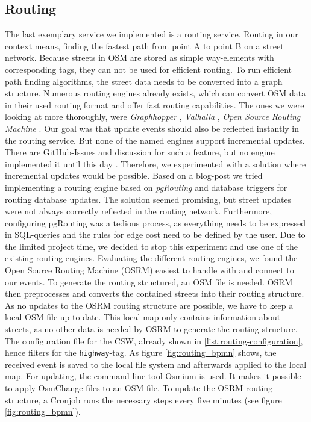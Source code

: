\documentclass[conference]{IEEEtran}
\begin{document}
\subsection{Routing}
\label{subsec:Routing}
The last exemplary service we implemented is a routing service. Routing in our context means, finding the fastest path from point A to point B on a street network. Because streets in OSM are stored as simple way-elements with corresponding tags, they can not be used for efficient routing. To run efficient path finding algorithms, the street data needs to be converted into a graph structure. Numerous routing engines already exists, which can convert OSM data in their used routing format and offer fast routing capabilities. The ones we were looking at more thoroughly, were \textit{Graphhopper} \cite{noauthor_graphhopper_2022}, \textit{Valhalla} \cite{noauthor_valhallavalhalla_2022}, \textit{Open Source Routing Machine} \cite{luxen-vetter-2011}. 
Our goal was that update events should also be reflected instantly in the routing service. But none of the named engines support incremental updates. There are GitHub-Issues and discussion for such a feature, but no engine implemented it until this day \cite{noauthor_update_2021}\cite{noauthor_can_nodate}\cite{noauthor_incremental_nodate}. Therefore, we experimented with a solution where incremental updates would be possible. Based on a blog-post \cite{rodrigo_imposm2pgrouting_2020} we tried implementing a routing engine based on \textit{pgRouting} \cite{noauthor_pgrouting_nodate} and database triggers for routing database updates. The solution seemed promising, but street updates were not always correctly reflected in the routing network. Furthermore, configuring pgRouting was a tedious process, as everything needs to be expressed in SQL-queries and the rules for edge cost need to be defined by the user. Due to the limited project time, we decided to stop this experiment and use one of the existing routing engines. Evaluating the different routing engines, we found the Open Source Routing Machine (OSRM) easiest to handle with and connect to our events. To generate the routing structured, an OSM file is needed. OSRM then preprocesses and converts the contained streets into their routing structure. 
As no updates to the OSRM routing structure are possible, we have to keep a local OSM-file up-to-date. This local map only contains information about streets, as no other data is needed by OSRM to generate the routing structure. The configuration file for the CSW, already shown in \ref{list:routing-configuration}, hence filters for the \texttt{highway}-tag. As figure \ref{fig:routing_bpmn} shows, the received event is saved to the local file system and afterwards applied to the local map. For updating, the command line tool Osmium \cite{noauthor_osmium_2022} is used. It makes it possible to apply OsmChange files to an OSM file. To update the OSRM routing structure, a Cronjob runs the necessary steps every five minutes (see figure \ref{fig:routing_bpmn}).
\end{document}
